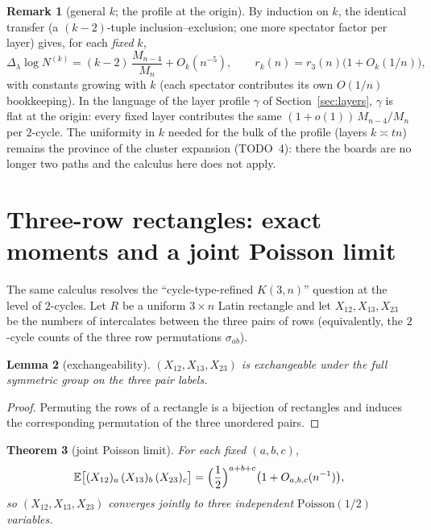 \documentclass[11pt]{article}
\newtheorem{theorem}{Theorem}[section]
\newtheorem{lemma}[theorem]{Lemma}
\theoremstyle{definition}
\newtheorem{remark}[theorem]{Remark}
\newcommand{\E}{\mathbb{E}}
\begin{document}
\begin{remark}[general $k$; the profile at the origin]\label{rem:layerk}
By induction on $k$, the identical transfer (a $(k{-}2)$-tuple
inclusion--exclusion; one more spectator factor per layer) gives, for
each \emph{fixed} $k$,
\[
\Delta_\lambda\log N^{(k)}=(k-2)\,\frac{M_{n-4}}{M_n}+O_k(n^{-5}),
\qquad
r_k(n)=r_3(n)\bigl(1+O_k(1/n)\bigr),
\]
with constants growing with $k$ (each spectator contributes its own
$O(1/n)$ bookkeeping).  In the language of the layer profile
$\gamma$ of Section~\ref{sec:layers}, $\gamma$ is flat at the origin:
every fixed layer contributes the same $(1+o(1))\,M_{n-4}/M_n$ per
$2$-cycle.  The uniformity in $k$ needed for the bulk of the profile
(layers $k\asymp tn$) remains the province of the cluster expansion
(TODO~4): there the boards are no longer two paths and the calculus
here does not apply.
\end{remark}


\section{Three-row rectangles: exact moments and a joint Poisson limit}\label{sec:threerow}

The same calculus resolves the ``cycle-type-refined $K(3,n)$'' question at
the level of $2$-cycles.  Let $R$ be a uniform $3\times n$ Latin rectangle
and let $X_{12},X_{13},X_{23}$ be the numbers of intercalates between the
three pairs of rows (equivalently, the $2$-cycle counts of the three row
permutations $\sigma_{ab}$).

\begin{lemma}[exchangeability]\label{lem:exch}
$(X_{12},X_{13},X_{23})$ is exchangeable under the full symmetric group on
the three pair labels.
\end{lemma}

\begin{proof}
Permuting the rows of a rectangle is a bijection of rectangles and induces
the corresponding permutation of the three unordered pairs.
\end{proof}

\begin{theorem}[joint Poisson limit]\label{thm:poisson}
For each fixed $(a,b,c)$,
\[
\E\bigl[(X_{12})_a\,(X_{13})_b\,(X_{23})_c\bigr]
=\Bigl(\frac12\Bigr)^{a+b+c}\bigl(1+O_{a,b,c}(n^{-1})\bigr),
\]
so $(X_{12},X_{13},X_{23})$ converges jointly to three independent
$\mathrm{Poisson}(1/2)$ variables.
\end{theorem}
\end{document}
